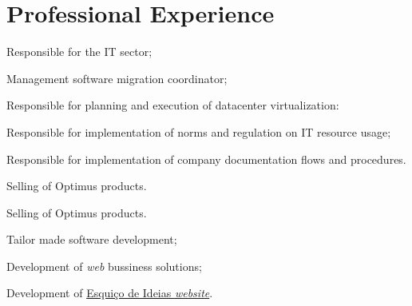 \documentclass[letterpaper]{deedy-resume} %
\begin{document}
\begin{minipage}[t]{0.66\textwidth}

\section{Professional Experience}


\vspace{\topsep}
\begin{tightitemize}
	\item Responsible for the IT sector;
	\item Management software migration coordinator;
	\item Responsible for planning and execution of datacenter virtualization:
	\item Responsible for implementation of norms and regulation on IT resource usage;
	\item Responsible for implementation of company documentation flows and procedures.
\end{tightitemize}

\sectionspace


\begin{tightitemize}
	\item Selling of Optimus products.
\end{tightitemize}

\sectionspace


\begin{tightitemize}
	\item Selling of Optimus products.
\end{tightitemize}

\sectionspace


\begin{tightitemize}
	\item Tailor made software development;
	\item Development of \textit{web} bussiness solutions;
	\item Development of \href{http://esquicodeideias.com}{Esquiço de Ideias \textit{website}}.
\end{tightitemize}


\end{minipage}
\end{document}
